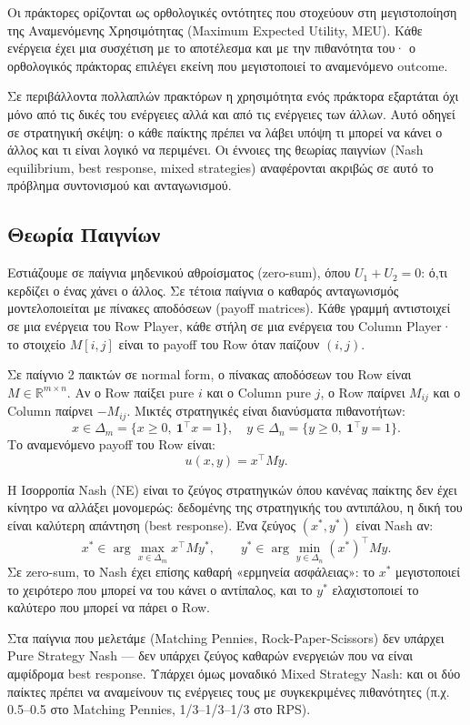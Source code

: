 \documentclass[11pt,a4paper]{article}
\begin{document}
Οι πράκτορες ορίζονται ως ορθολογικές οντότητες που στοχεύουν στη μεγιστοποίηση της Αναμενόμενης Χρησιμότητας (Maximum Expected Utility, MEU). Κάθε ενέργεια έχει μια συσχέτιση με το αποτέλεσμα και με την πιθανότητα του· ο ορθολογικός πράκτορας επιλέγει εκείνη που μεγιστοποιεί το αναμενόμενο outcome.

Σε περιβάλλοντα πολλαπλών πρακτόρων η χρησιμότητα ενός πράκτορα εξαρτάται όχι μόνο από τις δικές του ενέργειες αλλά και από τις ενέργειες των άλλων. Αυτό οδηγεί σε στρατηγική σκέψη: ο κάθε παίκτης πρέπει να λάβει υπόψη τι μπορεί να κάνει ο άλλος και τι είναι λογικό να περιμένει. Οι έννοιες της θεωρίας παιγνίων (Nash equilibrium, best response, mixed strategies) αναφέρονται ακριβώς σε αυτό το πρόβλημα συντονισμού και ανταγωνισμού.

\subsection{Θεωρία Παιγνίων}

Εστιάζουμε σε παίγνια μηδενικού αθροίσματος (zero-sum), όπου \(U_1 + U_2 = 0\): ό,τι κερδίζει ο ένας χάνει ο άλλος. Σε τέτοια παίγνια ο καθαρός ανταγωνισμός μοντελοποιείται με πίνακες αποδόσεων (payoff matrices). Κάθε γραμμή αντιστοιχεί σε μια ενέργεια του Row Player, κάθε στήλη σε μια ενέργεια του Column Player· το στοιχείο \(M[i,j]\) είναι το payoff του Row όταν παίζουν \((i, j)\).

Σε παίγνιο 2 παικτών σε normal form, ο πίνακας αποδόσεων του Row είναι \(M \in \mathbb{R}^{m \times n}\). Αν ο Row παίξει pure \(i\) και ο Column pure \(j\), ο Row παίρνει \(M_{ij}\) και ο Column παίρνει \(-M_{ij}\). Μικτές στρατηγικές είναι διανύσματα πιθανοτήτων:
\[
x \in \Delta_m = \{x \ge 0,\ \mathbf{1}^\top x = 1\}, \quad
y \in \Delta_n = \{y \ge 0,\ \mathbf{1}^\top y = 1\}.
\]
Το αναμενόμενο payoff του Row είναι:
\[
u(x,y) = x^\top M y.
\]

Η Ισορροπία Nash (NE) είναι το ζεύγος στρατηγικών όπου κανένας παίκτης δεν έχει κίνητρο να αλλάξει μονομερώς: δεδομένης της στρατηγικής του αντιπάλου, η δική του είναι καλύτερη απάντηση (best response). Ένα ζεύγος \((x^*, y^*)\) είναι Nash αν:
\[
x^* \in \arg\max_{x \in \Delta_m} x^\top M y^*, \qquad
y^* \in \arg\min_{y \in \Delta_n} (x^*)^\top M y.
\]
Σε zero-sum, το Nash έχει επίσης καθαρή «ερμηνεία ασφάλειας»: το \(x^*\) μεγιστοποιεί το χειρότερο που μπορεί να του κάνει ο αντίπαλος, και το \(y^*\) ελαχιστοποιεί το καλύτερο που μπορεί να πάρει ο Row.

Στα παίγνια που μελετάμε (Matching Pennies, Rock-Paper-Scissors) δεν υπάρχει Pure Strategy Nash — δεν υπάρχει ζεύγος καθαρών ενεργειών που να είναι αμφίδρομα best response. Υπάρχει όμως μοναδικό Mixed Strategy Nash: και οι δύο παίκτες πρέπει να αναμείνουν τις ενέργειες τους με συγκεκριμένες πιθανότητες (π.χ. 0.5–0.5 στο Matching Pennies, 1/3–1/3–1/3 στο RPS).
\end{document}
